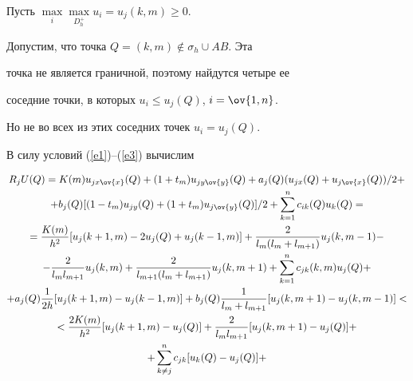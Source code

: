 \begin{pf}


Пусть $\max\limits_i\max\limits_{D^+_h} u_{i}=u_j(k,m)\geq 0$.


Допустим, что точка $Q=(k,m)\notin \sigma_h \cup AB$. Эта


точка не является граничной, поэтому найдутся четыре ее


соседние точки, в которых $u_i \leq


u_j(Q)$, $i=\ov{1,n}$.


Но не во всех из этих соседних точек $u_i = u_j(Q)$.


В силу условий (\ref{e1})--(\ref{e3}) вычислим


\begin{gather*}


R_jU(Q)=K(m)u_{jx\ov{x}}(Q)+(1+t_{m})


u_{jy\ov{y}}(Q)+a_j(Q)(u_{jx}(Q)+ u_{j\ov{x}}(Q))/2+\\


%


+b_j(Q)[(1-t_{m})u_{jy}(Q)+(1+t_{m})u_{j\ov{y}}(Q)]/2+


\sum\limits_{k=1}^n c_{ik}(Q)u_k(Q)=\\


%


=\frac{K(m)}{h^2} [ u_j(k+1, m) - 2u_j(Q) + u_j(k-1, m)


] + \frac{2}{l_m(l_m+l_{m+1})}u_j(k,{m-1})-\\


%


-\frac{2}{l_m l_{m+1}}u_j(k, {m}) +


\frac{2}{l_{m+1}(l_m+l_{m+1})}u_j(k, {m+1}) +


 \sum\limits_{k=1}^{n} c_{jk}(k,m)u_j(Q)+\\


%


+ a_j(Q)\frac{1}{2h} [ u_j(k+1,m) - u_j(k-1,m) ] +


b_j(Q)\frac{1}{l_m + l_{m+1}} [ u_j(k,m+1) -


u_j(k,m-1) ]<\\


%


<\frac {2K(m)}{h^2}[u_j(k+1,m)-u_j(Q)]+


\frac{2}{l_{m}l_{m+1}}[u_j(k,{m+1}) - u_j(Q)]+\\


%


+\sum_{k\ne j}^n c_{jk}[u_k(Q)-u_j(Q)]+



\end{gather*}
\end{pf}
